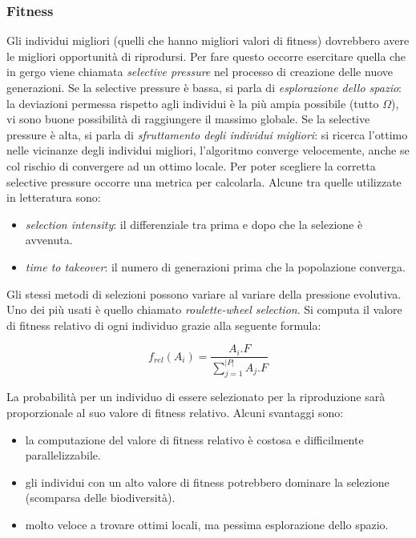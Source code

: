\documentclass[10pt,a4paper]{article}
\begin{document}
\subsubsection{Fitness}

Gli individui migliori (quelli che hanno migliori valori di fitness) dovrebbero avere le migliori opportunità di riprodursi. Per fare questo occorre esercitare quella che in gergo viene chiamata \emph{selective pressure} nel processo di creazione delle nuove generazioni. Se la selective pressure è bassa, si parla di \emph{esplorazione dello spazio}: la deviazioni permessa rispetto agli individui è la più ampia possibile (tutto $\Omega$), vi sono buone possibilità di raggiungere il massimo globale. Se la selective pressure è alta, si parla di \emph{sfruttamento degli individui migliori}: si ricerca l'ottimo nelle vicinanze degli individui migliori, l'algoritmo converge velocemente, anche se col rischio di convergere ad un ottimo locale. Per poter scegliere la corretta selective pressure occorre una metrica per calcolarla. Alcune tra quelle utilizzate in letteratura sono:
\begin{itemize}
\item{\emph{selection intensity}: il differenziale tra prima e dopo che la selezione è avvenuta.}
\item{\emph{time to takeover}: il numero di generazioni prima che la popolazione converga.}
\end{itemize} 

Gli stessi metodi di selezioni possono variare al variare della pressione evolutiva. Uno dei più usati è quello chiamato \emph{roulette-wheel selection}. Si computa il valore di fitness relativo di ogni individuo grazie alla seguente formula:

$$
f_{rel}(A_i) = \frac{A_i.F}{\sum_{j=1}^{|P|} A_j.F}
$$

La probabilità per un individuo di essere selezionato per la riproduzione sarà proporzionale al suo valore di fitness relativo. Alcuni svantaggi sono:

\begin{itemize}
\item{la computazione del valore di fitness relativo è costosa e difficilmente parallelizzabile.}
\item{gli individui con un alto valore di fitness potrebbero dominare la selezione (scomparsa delle biodiversità).}
\item{molto veloce a trovare ottimi locali, ma pessima esplorazione dello spazio.}
\end{itemize}
\end{document}
